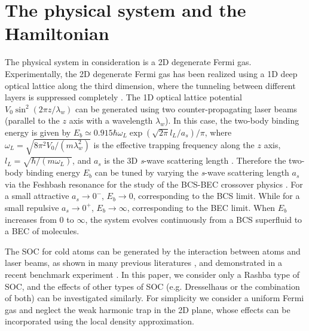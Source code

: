\documentclass[pra,print,showpacs,superscriptaddress,twocolumn]{revtex4}
\begin{document}
\section{The physical system and the Hamiltonian}

The physical system in consideration is a 2D degenerate Fermi gas.
Experimentally, the 2D degenerate Fermi gas has been realized using a 1D
deep optical lattice along the third dimension, where the tunneling between
different layers is suppressed completely \cite{Martiyanov,BF}. The 1D
optical lattice potential $V_{0}\sin ^{2}(2\pi z/\lambda _{w})$ can be
generated using two counter-propagating laser beams (parallel to the $z$
axis with a wavelength $\lambda _{w}$). In this case, the two-body binding
energy is given by $E_{b}\simeq 0.915\hbar \omega _{L}\exp (\sqrt{2\pi }%
l_{L}/a_{s})/\pi $, where $\omega _{L}=\sqrt{8\pi ^{2}V_{0}/(m\lambda
_{w}^{2})}$ is the effective trapping frequency along the $z$ axis, $l_{L}=%
\sqrt{\hbar /(m\omega _{L})}$, and $a_{s}$ is the 3D \textit{s}-wave
scattering length \cite{JT}. Therefore the two-body binding energy $E_{b}$
can be tuned by varying the \textit{s}-wave scattering length $a_{s}$ via
the Feshbash resonance for the study of the BCS-BEC crossover physics \cite%
{MR}. For a small attractive $a_{s}\rightarrow 0^{-}$, $E_{b}\rightarrow 0$,
corresponding to the BCS limit. While for a small repulsive $%
a_{s}\rightarrow 0^{+}$, $E_{b}\rightarrow \infty $, corresponding to the
BEC limit. When $E_{b}$ increases from 0 to $\infty $, the system evolves
continuously from a BCS superfluid to a BEC of molecules.

The SOC for cold atoms can be generated by the interaction between atoms and
laser beams, as shown in many previous literatures \cite{lasersetup}, and
demonstrated in a recent benchmark experiment \cite{LYJ1}. In this paper, we
consider only a Rashba type of SOC, and the effects of other types of SOC
(e.g. Dresselhaus or the combination of both) can be investigated similarly.
For simplicity we consider a uniform Fermi gas and neglect the weak harmonic
trap in the 2D plane, whose effects can be incorporated using the local
density approximation.
\end{document}
